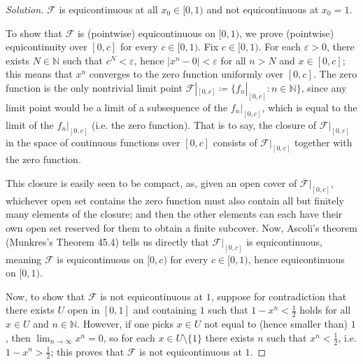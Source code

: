 \documentclass[10pt]{article}
\providecommand{\ol}{\overline}
\providecommand{\eps}{\varepsilon}
\providecommand{\half}{\frac{1}{2}}
\providecommand{\NN}{\mathbb N}
\newenvironment{soln}{\begin{proof}[Solution]}{\end{proof}}
\providecommand{\abs}[1]{\left\lvert #1\right\rvert}
\begin{document}
\begin{soln}
    $\mathcal F$ is equicontinuous at all $x_0\in[0,1)$
    and not equicontinuous at $x_0 = 1$.

    To show that $\mathcal F$ is (pointwise) equicontinuous on $[0,1)$,
    we prove (pointwise) equicontinuity over $[0,c]$ for every $c\in[0,1)$.
    Fix $c\in[0,1)$. For each $\eps>0$, there exists $N\in\NN$ such that
    $c^N < \eps$, hence $\abs{x^n - 0} < \eps$ for all $n > N$
    and $x\in[0,c]$; this means that $x^n$ converges to the zero function
    uniformly over $[0,c]$. The zero function is the only nontrivial limit point
    $\mathcal F|_{[0,c]} \coloneq\{f_n|_{[0,c]} : n\in\NN\}$, since
    any limit point would be a limit of a subsequence of the $f_n|_{[0,c]}$,
    which is equal to the limit of the $f_n|_{[0,c]}$ (i.e. the zero function).
    That is to say, the closure of $\mathcal F|_{[0,c]}$
    in the space of continuous functions over $[0,c]$ consists of
    $\mathcal F|_{[0,c]}$ together with the zero function.

    This closure is easily seen to be compact,
    as, given an open cover of $\ol{\mathcal F}|_{[0,c]}$,
    whichever open set contains the zero function must also contain
    all but finitely many elements of the closure;
    and then the other elements can each have their own open set reserved for them
    to obtain a finite subcover.
    Now, Ascoli's theorem (Munkres's Theorem 45.4) tells us directly
    that $\mathcal F|_{[0,c]}$ is equicontinuous, meaning
    $\mathcal F$ is equicontinuous on $[0,c)$ for every $c\in[0,1)$,
    hence equicontinuous on $[0,1)$.

    Now, to show that $\mathcal F$ is not equicontinuous at $1$,
    suppose for contradiction that there exists $U$ open in $[0,1]$ and
    containing $1$ such that $1-x^n < \half$
    holds for all $x\in U$ and $n\in\NN$.
    However, if one picks $x\in U$ not equal to (hence smaller than) $1$,
    then $\lim_{n\to\infty}x^n = 0$, so for each $x\in U\setminus\{1\}$
    there exists $n$ such that $x^n < \half$, i.e. $1 - x^n > \half$;
    this proves that $\mathcal F$ is not equicontinuous at $1$.
\end{soln}
\end{document}
